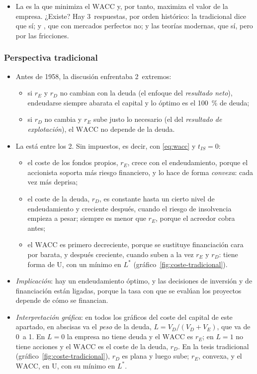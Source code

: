 \documentclass[11pt]{article}
\begin{document}
\begin{itemize}
\item La  es la que minimiza el $\mathrm{WACC}$ y, por tanto, maximiza el valor de la empresa. ¿Existe? Hay 3~respuestas, por orden histórico: la tradicional dice que sí;  y , que con mercados perfectos no; y las teorías modernas, que sí, pero por las fricciones.
\end{itemize}

\subsubsection{Perspectiva tradicional}\label{sec:tradicional}

\begin{itemize}
\item Antes de 1958, la discusión enfrentaba 2~extremos\nocite{Durand1952Costs}:
  \begin{itemize}
  \item si $r_E$ y $r_D$ no cambian con la deuda (el enfoque del \emph{resultado neto}), endeudarse siempre abarata el capital y lo óptimo es el 100~\% de deuda;
  \item si $r_D$ no cambia y $r_E$ sube justo lo necesario (el del \emph{resultado de explotación}), el $\mathrm{WACC}$ no depende de la deuda.
  \end{itemize}
\item La  está entre los 2. Sin impuestos, es decir, con \eqref{eq:wacc} y $t_{IS}=0$:
  \begin{itemize}
  \item el coste de los fondos propios, $r_E$, crece con el endeudamiento, porque el accionista soporta más riesgo financiero, y lo hace de forma \emph{convexa}: cada vez más deprisa;
  \item el coste de la deuda, $r_D$, es constante hasta un cierto nivel de endeudamiento y creciente después, cuando el riesgo de insolvencia empieza a pesar; siempre es menor que $r_E$, porque el acreedor cobra antes;
  \item el $\mathrm{WACC}$ es primero decreciente, porque se sustituye financiación cara por barata, y después creciente, cuando suben a la vez $r_E$ y $r_D$: tiene forma de U, con un mínimo en $L^*$ (gráfico~\ref{fig:coste-tradicional}).
  \end{itemize}
\item \emph{Implicación}: hay un endeudamiento óptimo, y las decisiones de inversión y de financiación están ligadas, porque la tasa con que se evalúan los proyectos depende de cómo se financian.
\item \emph{Interpretación gráfica}: en todos los gráficos del coste del capital de este apartado, en abscisas va el \emph{peso} de la deuda, $L=V_D/(V_D+V_E)$, que va de 0~a 1. En $L=0$ la empresa no tiene deuda y el $\mathrm{WACC}$ es $r_E$; en $L=1$ no tiene acciones y el $\mathrm{WACC}$ es el coste de la deuda, $r_D$. En la tesis tradicional (gráfico~\ref{fig:coste-tradicional}), $r_D$ es plana y luego sube; $r_E$, convexa, y el $\mathrm{WACC}$, en U, con su mínimo en $L^*$.
\end{itemize}
\end{document}
